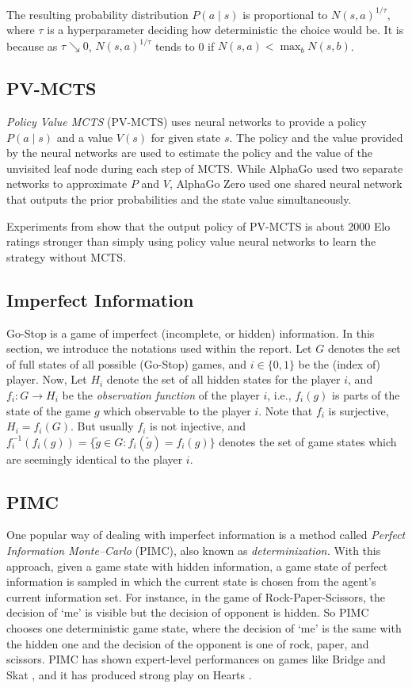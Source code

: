 \documentclass[10pt,twocolumn,letterpaper]{article}
\begin{document}
The resulting probability distribution $P(a\mid s)$ is proportional to $N(s, a)^{1/\tau}$, where $\tau$ is a hyperparameter deciding how deterministic the choice would be. It is because as $\tau \searrow 0$, $N(s, a)^{1/\tau}$ tends to 0 if $N(s, a) < \max_{b} N(s, b)$.

\subsection{PV-MCTS}
\textit{Policy Value MCTS} (PV-MCTS) uses neural networks to provide a policy $P(a\mid s)$ and a value $V(s)$ for given state $s$. The policy and the value provided by the neural networks are used to estimate the policy and the value of the unvisited leaf node during each step of MCTS. While AlphaGo used two separate networks to approximate $P$ and $V$, AlphaGo Zero used one shared neural network that outputs the prior probabilities and the state value simultaneously.

Experiments from \cite{Sil2017} show that the output policy of PV-MCTS is about 2000 Elo ratings stronger than simply using policy value neural networks to learn the strategy without MCTS.

\subsection{Imperfect Information}
Go-Stop is a game of imperfect (incomplete, or hidden) information. In this section, we introduce the notations used within the report. Let $G$ denotes the set of full states of all possible (Go-Stop) games, and $i\in \{0,1\}$ be the (index of) player. Now, Let $H_i$ denote the set of all hidden states for the player $i$, and $f_i\colon G\to H_i$ be the \textit{observation function} of the player $i$, i.e., $f_i(g)$ is parts of the state of the game $g$ which observable to the player $i$. Note that $f_i$ is surjective, $H_i = f_i(G)$. But usually $f_i$ is not injective, and $f_i^{-1}(f_i(g)) = \{\tilde g\in G\colon f_i(\tilde g) = f_i(g)\}$ denotes the set of game states which are seemingly identical to the player $i$.

\subsection{PIMC}
One popular way of dealing with imperfect information is a method called \textit{Perfect Information Monte--Carlo} (PIMC), also known as \textit{determinization.} With this approach, given a game state with hidden information, a game state of perfect information is sampled in which the current state is chosen from the agent's current information set. For instance, in the game of Rock-Paper-Scissors, the decision of `me' is visible but the decision of opponent is hidden. So PIMC chooses one deterministic game state, where the decision of `me' is the same with the hidden one and the decision of the opponent is one of rock, paper, and scissors. PIMC has shown expert-level performances on games like Bridge \cite{Gin2001} and Skat \cite{Bur2009}, and it has produced strong play on Hearts \cite{Stu2008}.
\end{document}
